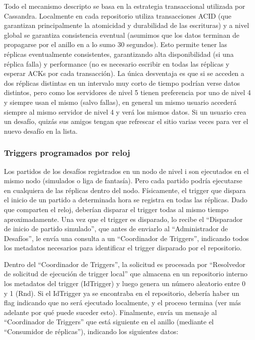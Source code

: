 Todo el mecanismo descripto se basa en la estrategia transaccional utilizada por Cassandra. Localmente en cada repositorio utiliza transacciones ACID (que garantizan principalmente la atomicidad y durabilidad de las escrituras) y a nivel global se garantiza consistencia eventual (asumimos que los datos terminan de propagarse por el anillo en a lo sumo 30 segundos). Esto permite tener las réplicas eventualmente consistentes, garantizando alta disponibilidad (si una réplica falla) y performance (no es necesario escribir en todas las réplicas y esperar ACKs por cada transacción). La única desventaja es que si se acceden a dos réplicas distintas en un intervalo muy corto de tiempo podrían verse datos distintos, pero como los servidores de nivel 5 tienen preferencia por uno de nivel 4 y siempre usan el mismo (salvo fallas), en general un mismo usuario accederá siempre al mismo servidor de nivel 4 y verá los mismos datos. Si un usuario crea un desafío, quizás sus amigos tengan que refrescar el sitio varias veces para ver el nuevo desafío en la lista.

\subsubsection{Triggers programados por reloj}

Los partidos de los desafíos registrados en un nodo de nivel i son ejecutados en el mismo nodo (simulados o liga de fantasía). Pero cada partido podría ejecutarse en cualquiera de las réplicas dentro del nodo. Físicamente, el trigger que dispara el inicio de un partido a determinada hora se registra en todas las réplicas. Dado que comparten el reloj, deberían disparar el trigger todas al mismo tiempo aproximadamente. Una vez que el trigger es disparado, lo recibe el “Disparador de inicio de partido simulado”, que antes de enviarlo al “Administrador de Desafíos”, le envía una consulta a un “Coordinador de Triggers”, indicando todos los metadatos necesarios para identificar el trigger disparado por el repositorio.

Dentro del “Coordinador de Triggers”, la solicitud es procesada por “Resolvedor de solicitud de ejecución de trigger local” que almacena en un repositorio interno los metadatos del trigger (IdTrigger) y luego genera un número aleatorio entre 0 y 1 (Rnd). Si el IdTrigger ya se encontraba en el repositorio, debería haber un flag indicando que no será ejecutado localmente, y el proceso termina (ver más adelante por qué puede suceder esto). Finalmente, envía un mensaje al “Coordinador de Triggers” que está siguiente en el anillo (mediante el “Consumidor de réplicas”), indicando los siguientes datos:

